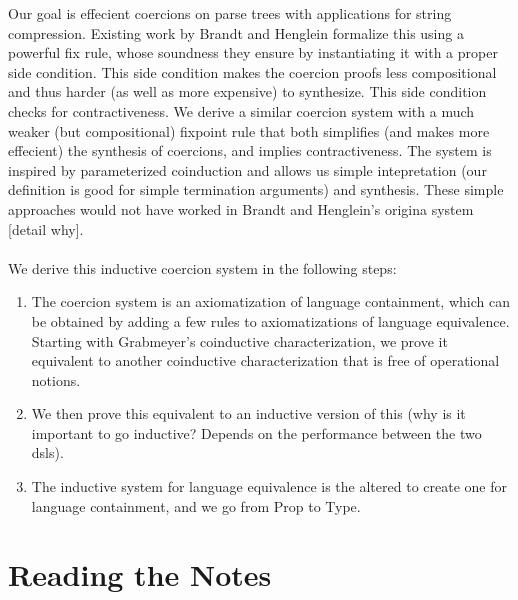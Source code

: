 \documentclass[a4paper,UKenglish,cleveref, autoref, thm-restate]{lipics-v2021}
\begin{document}
Our goal is effecient coercions on parse trees with applications for string compression. 
Existing work by Brandt and Henglein formalize this using a powerful fix rule, whose soundness they ensure by instantiating it with a proper side condition. This side condition makes the coercion proofs less compositional and thus harder (as well as more expensive) to synthesize. This side condition checks for contractiveness. We derive a similar coercion system with a much weaker (but compositional) fixpoint rule that both simplifies (and makes more effecient) the synthesis of coercions, and implies contractiveness. The system is inspired by parameterized coinduction and allows us simple intepretation (our definition is good for simple termination arguments) and synthesis. These simple approaches would not have worked in Brandt and Henglein's origina system [detail why].\\\\
We derive this inductive coercion system in the following steps: 
\begin{enumerate}
\item The coercion system is an axiomatization of language containment, which can be obtained by adding a few rules to axiomatizations of language equivalence. Starting with Grabmeyer's coinductive characterization, we prove it equivalent to another coinductive characterization that is free of operational notions. 
\item We then prove this equivalent to an inductive version of this (why is it important to go inductive? Depends on the performance between the two dsls). 
\item The inductive system for language equivalence is the altered to create one for language containment, and we go from Prop to Type.
\end{enumerate}


\section{Reading the Notes}
\end{document}

